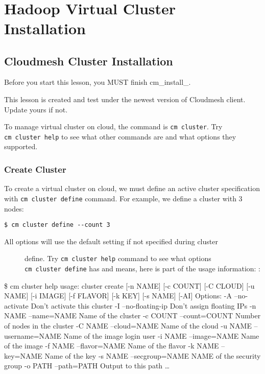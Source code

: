 \FILENAME\
\section{Hadoop Virtual Cluster
Installation}\label{hadoop-virtual-cluster-installation}

\subsection{Cloudmesh Cluster
Installation}\label{cloudmesh-cluster-installation}

Before you start this lesson, you MUST finish cm\_install\_.

This lesson is created and test under the newest version of Cloudmesh
client. Update yours if not.

To manage virtual cluster on cloud, the command is \texttt{cm\ cluster}.
Try \texttt{cm\ cluster\ help} to see what other commands are and what
options they supported.

\subsubsection{Create Cluster}\label{create-cluster}

To create a virtual cluster on cloud, we must define an active cluster
specification with \texttt{cm\ cluster\ define} command. For example, we
define a cluster with 3 nodes:

\begin{verbatim}
$ cm cluster define --count 3
\end{verbatim}

\begin{description}
\item[All options will use the default setting if not specified during
cluster]
define. Try \texttt{cm\ cluster\ help} command to see what options
\texttt{cm\ cluster\ define} has and means, here is part of the usage
information: :
\end{description}

\$ cm cluster help usage: cluster create {[}-n NAME{]} {[}-c COUNT{]}
{[}-C CLOUD{]} {[}-u NAME{]} {[}-i IMAGE{]} {[}-f FLAVOR{]} {[}-k KEY{]}
{[}-s NAME{]} {[}-AI{]} Options: -A --no-activate Don't activate this
cluster -I --no-floating-ip Don't assign floating IPs -n NAME
--name=NAME Name of the cluster -c COUNT --count=COUNT Number of nodes
in the cluster -C NAME --cloud=NAME Name of the cloud -u NAME
--username=NAME Name of the image login user -i NAME --image=NAME Name
of the image -f NAME --flavor=NAME Name of the flavor -k NAME --key=NAME
Name of the key -s NAME --secgroup=NAME NAME of the security group -o
PATH --path=PATH Output to this path \ldots{}

